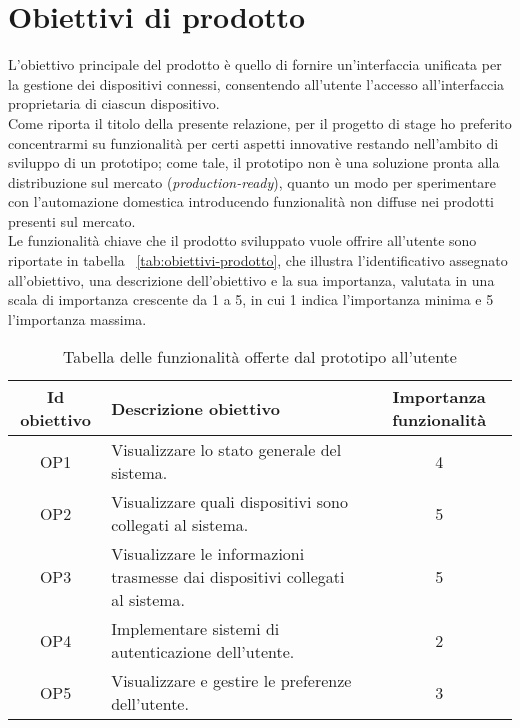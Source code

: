 \section{Obiettivi di prodotto}

L'obiettivo principale del prodotto è quello di fornire un'interfaccia unificata per la gestione dei dispositivi connessi, consentendo all'utente l'accesso all'interfaccia proprietaria di ciascun dispositivo. \\

Come riporta il titolo della presente relazione, per il progetto di stage ho preferito concentrarmi su funzionalità per certi aspetti innovative restando nell'ambito di sviluppo di un prototipo; come tale, il prototipo non è una soluzione pronta alla distribuzione sul mercato (\emph{production-ready}), quanto un modo per sperimentare con l'automazione domestica introducendo funzionalità non diffuse nei prodotti presenti sul mercato. \\

Le funzionalità chiave che il prodotto sviluppato vuole offrire all'utente sono riportate in tabella ~\ref{tab:obiettivi-prodotto}, che illustra l'identificativo assegnato all'obiettivo, una descrizione dell'obiettivo e la sua importanza, valutata in una scala di importanza crescente da 1 a 5, in cui 1 indica l'importanza minima e 5 l'importanza massima.

\begin{table}[H]
\caption{Tabella delle funzionalità offerte dal prototipo all'utente}
\label{tab:obiettivi-prodotto}
\begin{tabularx}{\linewidth}{|c|X|c|}
\hline
\textbf{Id obiettivo} & \textbf{Descrizione obiettivo} & \textbf{Importanza funzionalità}\\
\hline
\label{OP1} OP1 & Visualizzare lo stato generale del sistema. & 4 \\
\hline
\label{OP2} OP2 & Visualizzare quali dispositivi sono collegati al sistema. & 5 \\
\hline
\label{OP3} OP3 & Visualizzare le informazioni trasmesse dai dispositivi collegati al sistema. & 5 \\
\hline
\label{OP4} OP4 & Implementare sistemi di autenticazione dell'utente. & 2 \\
\hline
\label{OP5} OP5 & Visualizzare e gestire le preferenze dell'utente. & 3 \\
\hline
\end{tabularx}
\end{table}


